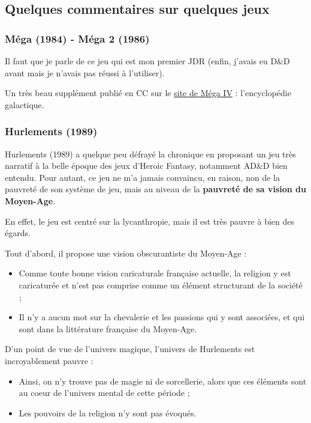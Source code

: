 \documentclass[a4paper, 11pt, twoside]{article}
\begin{document}
\subsection{Quelques commentaires sur quelques jeux}
\label{sec:org470a9d9}
\subsubsection{Méga (1984) - Méga 2 (1986)}
\label{sec:orgca876d3}
Il faut que je parle de ce jeu qui est mon premier JDR (enfin, j'avais eu D\&D avant mais je n'avais pas réussi à l'utiliser).

Un très beau supplément publié en CC sur le \href{https://www.messagers-galactiques.com}{site de Méga IV} : l'encyclopédie galactique.

\subsubsection{Hurlements (1989)}
\label{sec:org784a3cd}

Hurlements (1989) a quelque peu défrayé la chronique en proposant un jeu très narratif à la belle époque des jeux d'Heroic Fantasy, notamment AD\&D bien entendu. Pour autant, ce jeu ne m'a jamais convaincu, en raison, non de la pauvreté de son système de jeu, mais au niveau de la \textbf{pauvreté de sa vision du Moyen-Age}.

En effet, le jeu est centré sur la lycanthropie, mais il est très pauvre à bien des égards.

Tout d'abord, il propose une vision obscurantiste du Moyen-Age :
\begin{itemize}
\item Comme toute bonne vision caricaturale française actuelle, la religion y est caricaturée et n'est pas comprise comme un élément structurant de la société ;
\item Il n'y a aucun mot sur la chevalerie et les passions qui y sont associées, et qui sont dans la littérature française du Moyen-Age.
\end{itemize}

D'un point de vue de l'univers magique, l'univers de Hurlements est incroyablement pauvre :
\begin{itemize}
\item Ainsi, on n'y trouve pas de magie ni de sorcellerie, alors que ces éléments sont au coeur de l'univers mental de cette période ;
\item Les pouvoirs de la religion n'y sont pas évoqués.
\end{itemize}
\end{document}
